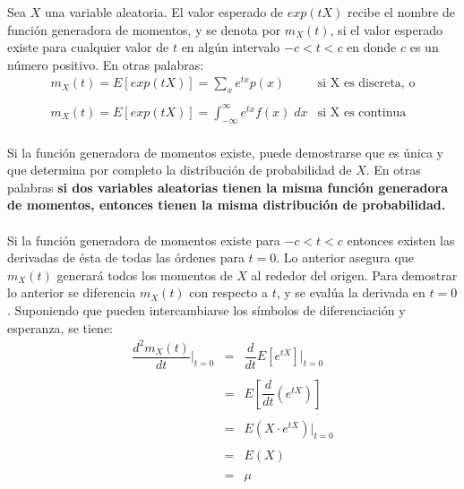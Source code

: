 \begin{tcolorbox}[colframe = white]
    \begin{def.}
	Sea $X$ una variable aleatoria. El valor esperado de $exp(tX)$ recibe el nombre de función generadora de momentos, y se denota por $m_X(t)$, si el valor esperado existe para cualquier valor de $t$ en algún intervalo $-c<t<c$ en donde $c$ es un número positivo. En otras palabras:
	$$\begin{array}{ll}
	    m_X(t) = E[exp(tX)] = \sum\limits_x e^{tx} p(x) & \mbox{si X es discreta, o}\\\\
	    m_X(t) = E[exp(tX)] = \displaystyle\int_{-\infty}^\infty e^{tx} f(x) \; dx & \mbox{si X es continua}\\
	\end{array}$$
    \end{def.}
\end{tcolorbox}
Si la función generadora de momentos existe, puede demostrarse que es única y que determina por completo la distribución de probabilidad de $X$. En otras palabras \textbf{si dos variables aleatorias tienen la misma función generadora de momentos, entonces tienen la misma distribución de probabilidad.}\\\\

Si la función generadora de momentos existe para $-c<t<c$ entonces existen las derivadas de ésta de todas las órdenes para $t=0$. Lo anterior asegura que $m_X(t)$ generará todos los momentos de $X$ al rededor del origen. Para demostrar lo anterior se diferencia $m_X(t)$ con respecto a $t$, y se evalúa la derivada en $t=0$. Suponiendo que pueden intercambiarse los símbolos de diferenciación y esperanza, se tiene:
$$\begin{array}{rcl}
    \dfrac{d^2m_X(t)}{dt}\bigg|_{t=0}&=&\dfrac{d}{dt}E[e^{tX}]\bigg|_{t=0}\\\\
				     &=&E\left[ \dfrac{d}{dt}(e^{tX}) \right]\\\\
				     &=&E\left(X \cdot e^{tX}\right)\bigg|_{t=0}\\\\
				     &=&E(X) \\\\
				     &=& \mu \\\\
\end{array}$$	

